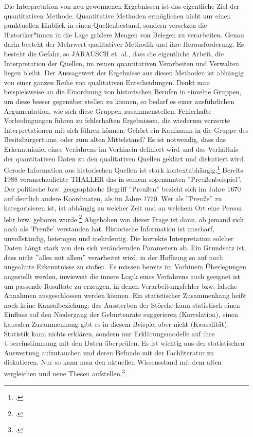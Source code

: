\documentclass[12pt,a4paper]{article}
\begin{document}
Die Interpretation von neu gewonnenen Ergebnissen ist das eigentliche Ziel der quantitativen Methode. Quantitative Methoden ermöglichen nicht nur einen punktuellen Einblick in einen Quellenbestand, sondern versetzen die Historiker*innen in die Lage größere Mengen von Belegen zu verarbeiten. Genau darin besteht der Mehrwert qualitativer Methodik und ihre Herausforderung. Es besteht die Gefahr, so JARAUSCH et. al., dass die eigentliche Arbeit, die Interpretation der Quellen, im reinen quantitativen Verarbeiten und Verwalten liegen bleibt. Der Aussagewert der Ergebnisse aus diesen Methoden ist abhängig von einer ganzen Reihe von qualitativen Entscheidungen. Denkt man beispielsweise an die Einordnung von historischen Berufen in einzelne Gruppen, um diese besser gegenüber stellen zu können, so bedarf es einer ausführlichen Argumentation, wie sich diese Gruppen zusammenstellen. Fehlerhafte  Vorbedingungen führen zu fehlerhaften Ergebnissen, die wiederum verzerrte Interpretationen mit sich führen können. Gehört ein Kaufmann in die Gruppe des Besitzbürgertums, oder zum alten Mittelstand? Es ist notwendig, dass das Erkenntnisziel eines Verfahrens im Vorhinein definiert wird und das Verhältnis der quantitativen Daten zu den qualitativen Quellen geklärt und diskutiert wird.
\\
Gerade Information aus historischen Quellen ist stark kontextabhängig.\footcite[][S.182-193]{jarausch1985quantitative} Bereits 1988 veranschaulichte THALLER das in seinem sogenannten ''Preußenbeispiel''. Der politische bzw. geographische Begriff ''Preußen'' bezieht sich im Jahre 1670 auf deutlich andere Koordinaten, als im Jahre 1770. Wer als ''Preuße'' zu kategorisieren ist, ist abhängig zu welcher Zeit und an welchem Ort eine Person lebt bzw. geboren wurde.\footcite[][S.264-266]{thaller2017historical} Abgehoben von dieser Frage ist dann, ob jemand sich auch als 'Preuße' verstanden hat. Historische Information ist unscharf, unvollständig, heterogen und mehrdeutig. Die korrekte Interpretation solcher Daten hängt stark von den sich verändernden Parametern ab.
Ein Grundsatz ist, dass nicht ''alles mit allem'' verarbeitet wird, in der Hoffnung so auf noch ungeahnte Erkenntnisse zu stoßen. Es müssen bereits im Vorhinein Überlegungen angestellt werden, inwieweit die innere Logik eines Verfahrens auch geeignet ist um passende Resultate zu erzeugen, in denen Verarbeitungsfehler bzw. falsche Annahmen ausgeschlossen werden können. Ein statistischer Zusammenhang heißt noch keine Kausalbeziehung: das Aussterben der Störche kann statistisch einen Einfluss auf den Niedergang der Geburtenrate suggerieren (Korrelation), einen kausalen Zusammenhang gibt es in diesem Beispiel aber nicht (Kausalität). Statistik kann nichts erklären, sondern nur Erklärungsmodelle auf ihre Übereinstimmung mit den Daten überprüfen. Es ist wichtig aus der statistischen Auswertung aufzutauchen und deren Befunde mit der Fachliteratur zu diskutieren. Nur so kann man den aktuellen Wissensstand mit dem alten vergleichen und neue Thesen aufstellen.\footcite[][S.182-191]{jarausch1985quantitative}
\end{document}
